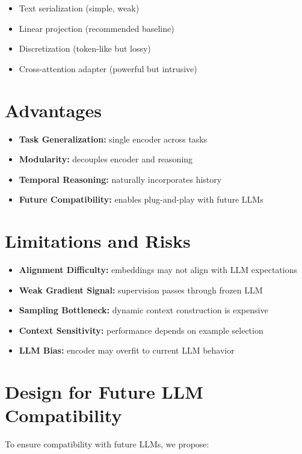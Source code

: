 \documentclass[11pt]{article}
\begin{document}
\begin{itemize}
\item Text serialization (simple, weak)
\item Linear projection (recommended baseline)
\item Discretization (token-like but lossy)
\item Cross-attention adapter (powerful but intrusive)
\end{itemize}

\section{Advantages}

\begin{itemize}
\item \textbf{Task Generalization:} single encoder across tasks
\item \textbf{Modularity:} decouples encoder and reasoning
\item \textbf{Temporal Reasoning:} naturally incorporates history
\item \textbf{Future Compatibility:} enables plug-and-play with future LLMs
\end{itemize}

\section{Limitations and Risks}

\begin{itemize}
\item \textbf{Alignment Difficulty:} embeddings may not align with LLM expectations
\item \textbf{Weak Gradient Signal:} supervision passes through frozen LLM
\item \textbf{Sampling Bottleneck:} dynamic context construction is expensive
\item \textbf{Context Sensitivity:} performance depends on example selection
\item \textbf{LLM Bias:} encoder may overfit to current LLM behavior
\end{itemize}

\section{Design for Future LLM Compatibility}

To ensure compatibility with future LLMs, we propose:
\end{document}
